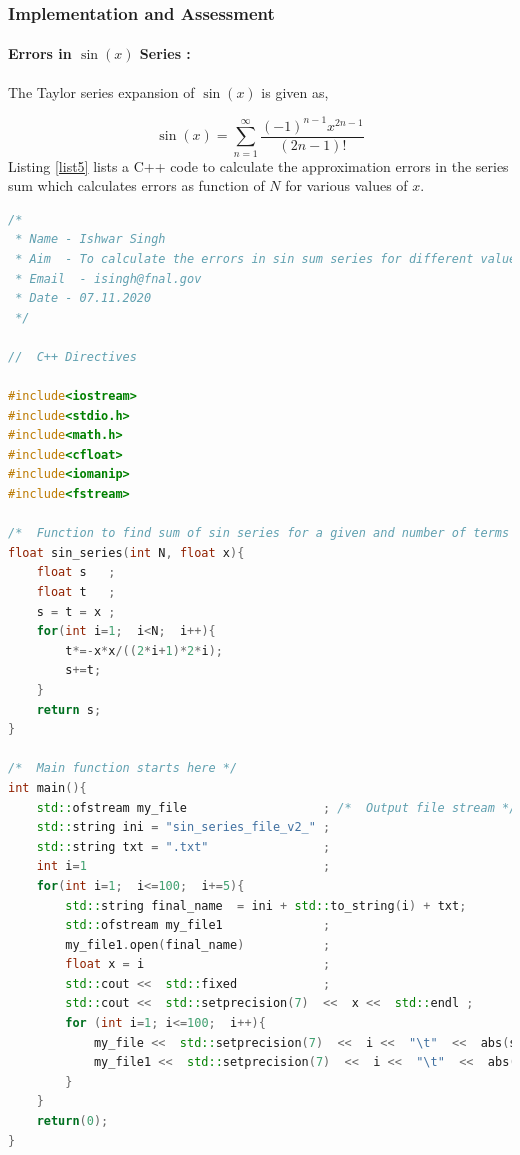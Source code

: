 \documentclass[a4,12pt]{article}
\numberwithin{equation}{subsection}
\begin{document}
\subsubsection{Implementation and Assessment}
\paragraph{Errors in $\sin(x)$ Series : } The Taylor series expansion of $\sin(x)$ is given as,

$$\sin(x)=\sum_{n=1}^{\infty} \frac{(-1)^{n-1} x^{2n-1}}{(2n-1)!}$$
Listing \ref{list5} lists a C++ code to calculate the approximation errors in the series sum which calculates errors as function of $N$ for various values of $x$.

\begin{lstlisting}[language=C++, caption= C++ code to calculate the approximation errors in the series sum of $\sin(x)$., label= list5]
/*
 * Name - Ishwar Singh
 * Aim  - To calculate the errors in sin sum series for different values of x.
 * Email  - isingh@fnal.gov
 * Date - 07.11.2020
 */

//  C++ Directives

#include<iostream>
#include<stdio.h>
#include<math.h>
#include<cfloat>
#include<iomanip>
#include<fstream>

/*  Function to find sum of sin series for a given and number of terms to be added  */
float sin_series(int N, float x){
    float s   ;
    float t   ;
    s = t = x ;
    for(int i=1;  i<N;  i++){
        t*=-x*x/((2*i+1)*2*i);
        s+=t;
    } 
    return s;
}

/*  Main function starts here */
int main(){
    std::ofstream my_file                   ; /*  Output file stream */
    std::string ini = "sin_series_file_v2_" ; 
    std::string txt = ".txt"                ;
    int i=1                                 ;
    for(int i=1;  i<=100;  i+=5){
        std::string final_name  = ini + std::to_string(i) + txt;
        std::ofstream my_file1              ;
        my_file1.open(final_name)           ;
        float x = i                         ;
        std::cout <<  std::fixed            ;
        std::cout <<  std::setprecision(7)  <<  x <<  std::endl ;
        for (int i=1; i<=100;  i++){
            my_file <<  std::setprecision(7)  <<  i <<  "\t"  <<  abs(sin_series(i,x)-sin_series(2*i,x)) <<  std::endl;
            my_file1 <<  std::setprecision(7)  <<  i <<  "\t"  <<  abs(sin_series(i,x)-sin_series(2*i,x)) <<  std::endl;
        }
    }
    return(0);
}
\end{lstlisting} 
\end{document}
